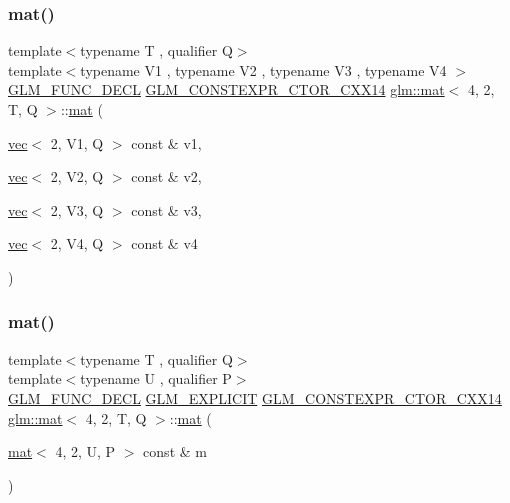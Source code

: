 \subsubsection{\texorpdfstring{mat()}{mat()}\hspace{0.1cm}{\footnotesize\ttfamily [8/21]}}
{\footnotesize\ttfamily template$<$typename T , qualifier Q$>$ \\
template$<$typename V1 , typename V2 , typename V3 , typename V4 $>$ \\
\hyperlink{setup_8hpp_ab2d052de21a70539923e9bcbf6e83a51}{G\+L\+M\+\_\+\+F\+U\+N\+C\+\_\+\+D\+E\+CL} \hyperlink{setup_8hpp_a0900f9145e68bf6061b6f5e7be3fa751}{G\+L\+M\+\_\+\+C\+O\+N\+S\+T\+E\+X\+P\+R\+\_\+\+C\+T\+O\+R\+\_\+\+C\+X\+X14} \hyperlink{structglm_1_1mat}{glm\+::mat}$<$ 4, 2, T, Q $>$\+::\hyperlink{structglm_1_1mat}{mat} (\begin{DoxyParamCaption}\item[{\hyperlink{structglm_1_1vec}{vec}$<$ 2, V1, Q $>$ const \&}]{v1,  }\item[{\hyperlink{structglm_1_1vec}{vec}$<$ 2, V2, Q $>$ const \&}]{v2,  }\item[{\hyperlink{structglm_1_1vec}{vec}$<$ 2, V3, Q $>$ const \&}]{v3,  }\item[{\hyperlink{structglm_1_1vec}{vec}$<$ 2, V4, Q $>$ const \&}]{v4 }\end{DoxyParamCaption})}

\mbox{\label{structglm_1_1mat_3_014_00_012_00_01_t_00_01_q_01_4_acae8a483921d714297536237a5f9013b}} 
\subsubsection{\texorpdfstring{mat()}{mat()}\hspace{0.1cm}{\footnotesize\ttfamily [9/21]}}
{\footnotesize\ttfamily template$<$typename T , qualifier Q$>$ \\
template$<$typename U , qualifier P$>$ \\
\hyperlink{setup_8hpp_ab2d052de21a70539923e9bcbf6e83a51}{G\+L\+M\+\_\+\+F\+U\+N\+C\+\_\+\+D\+E\+CL} \hyperlink{setup_8hpp_a6c74f5a5e7b134ab69023ff9a30d4d5d}{G\+L\+M\+\_\+\+E\+X\+P\+L\+I\+C\+IT} \hyperlink{setup_8hpp_a0900f9145e68bf6061b6f5e7be3fa751}{G\+L\+M\+\_\+\+C\+O\+N\+S\+T\+E\+X\+P\+R\+\_\+\+C\+T\+O\+R\+\_\+\+C\+X\+X14} \hyperlink{structglm_1_1mat}{glm\+::mat}$<$ 4, 2, T, Q $>$\+::\hyperlink{structglm_1_1mat}{mat} (\begin{DoxyParamCaption}\item[{\hyperlink{structglm_1_1mat}{mat}$<$ 4, 2, U, P $>$ const \&}]{m }\end{DoxyParamCaption})}

